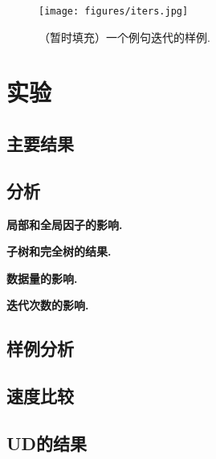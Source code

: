 \begin{figure}[tb]
    \centering
    \texttt{[image: figures/iters.jpg]}
    \caption{（暂时填充）一个例句迭代的样例.}
    \label{fig:dep-vi-iters}
\end{figure}


\section{实验}\label{sec:dep-vi-exp}

\subsection{主要结果}



\subsection{分析}

\noindent\textbf{局部和全局因子的影响.}

\noindent\textbf{子树和完全树的结果.}

\noindent\textbf{数据量的影响.}

\noindent\textbf{迭代次数的影响.}

\subsection{样例分析}

\subsection{速度比较}

\subsection{UD的结果}
